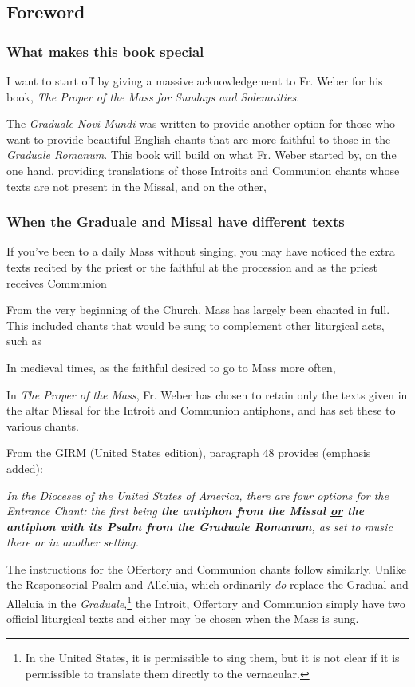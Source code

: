 \documentclass[10pt,parskip,paper=216mm:162mm]{graduale} %
\begin{document}
\subsection{Foreword}

\subsubsection{What makes this book special}
I want to start off by giving a massive acknowledgement to Fr. Weber for
his book, \emph{The Proper of the Mass for Sundays and Solemnities}.

The \emph{Graduale Novi Mundi} was written to provide another option for
those who want to provide beautiful English chants that are more faithful
to those in the \emph{Graduale Romanum}. This book will build on what
Fr. Weber started by, on the one hand, providing translations of those
Introits and Communion chants whose texts are not present in the Missal,
and on the other, 


\subsubsection{When the Graduale and Missal have different texts}
If you've been to a daily Mass without singing, you may have noticed the
extra texts recited by the priest or the faithful at the
procession and as the priest receives Communion

From the very beginning of the Church, Mass has largely been chanted in
full. This included chants that would be sung to complement other liturgical
acts, such as

In medieval times, as the faithful desired to go to Mass more often, 

In \emph{The Proper of the Mass}, Fr. Weber has chosen to retain only the texts
given in the altar Missal for the Introit and Communion antiphons, and has set these
to various chants.

From the GIRM (United States edition), paragraph 48 provides (emphasis added):
\begin{center}
    \itshape
    In the Dioceses of the United States of America,
    there are four options for the Entrance Chant: \lbrack the first being \rbrack
    \textbf{the antiphon from the Missal \underline{or} the antiphon with its Psalm from the Graduale Romanum},
    as set to music there or in another setting\lbrack.\rbrack
\end{center}
The instructions for the Offertory and Communion chants follow similarly.
Unlike the Responsorial Psalm and Alleluia, which ordinarily \emph{do}
replace the Gradual and Alleluia in the \emph{Graduale},\footnote{In the United States, it is 
permissible to sing them, but it is not clear if it is permissible to translate them directly to the vernacular.}
the Introit, Offertory and Communion simply have two official liturgical texts and either may be chosen
when the Mass is sung.
\end{document}
